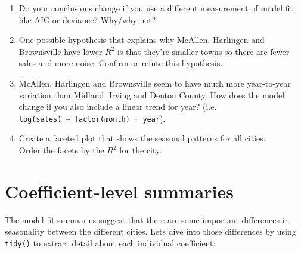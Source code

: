 \begin{enumerate}
\def\labelenumi{\arabic{enumi}.}
\item
  Do your conclusions change if you use a different measurement of model
  fit like AIC or deviance? Why/why not?
\item
  One possible hypothesis that explains why McAllen, Harlingen and
  Brownsville have lower \(R^2\) is that they're smaller towns so there
  are fewer sales and more noise. Confirm or refute this hypothesis.
\item
  McAllen, Harlingen and Brownsville seem to have much more year-to-year
  variation than Midland, Irving and Denton County. How does the model
  change if you also include a linear trend for year? (i.e.
  \texttt{log(sales)\ \textasciitilde{}\ factor(month)\ +\ year}).
\item
  Create a faceted plot that shows the seasonal patterns for all
  cities.\\
  Order the facets by the \(R^2\) for the city.
\end{enumerate}

\section{Coefficient-level summaries}

The model fit summaries suggest that there are some important
differences in seasonality between the different cities. Lets dive into
those differences by using \texttt{tidy()} to extract detail about each
individual coefficient: 

\begin{Shaded}
\end{Shaded}


